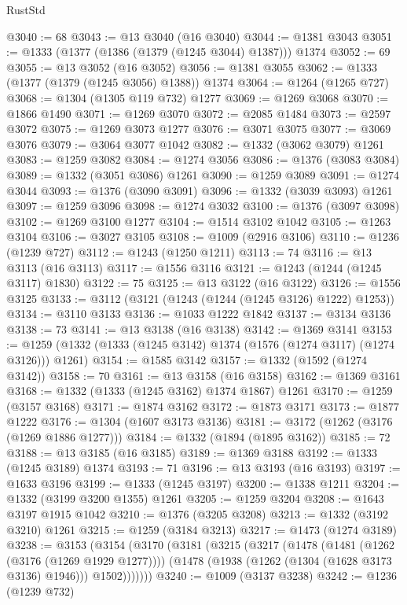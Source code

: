 \begin{lexlean}{RustStd}
\begin{coremodule}
@3040 := 68
@3043 := @13 @3040 (@16 @3040)
@3044 := @1381 @3043
@3051 := @1333 (@1377 (@1386 (@1379 (@1245 @3044) @1387))) @1374
@3052 := 69
@3055 := @13 @3052 (@16 @3052)
@3056 := @1381 @3055
@3062 := @1333 (@1377 (@1379 (@1245 @3056) @1388)) @1374
@3064 := @1264 (@1265 @727)
@3068 := @1304 (@1305 @119 @732) @1277
@3069 := @1269 @3068
@3070 := @1866 @1490
@3071 := @1269 @3070
@3072 := @2085 @1484
@3073 := @2597 @3072
@3075 := @1269 @3073 @1277
@3076 := @3071 @3075
@3077 := @3069 @3076
@3079 := @3064 @3077 @1042
@3082 := @1332 (@3062 @3079) @1261
@3083 := @1259 @3082
@3084 := @1274 @3056
@3086 := @1376 (@3083 @3084)
@3089 := @1332 (@3051 @3086) @1261
@3090 := @1259 @3089
@3091 := @1274 @3044
@3093 := @1376 (@3090 @3091)
@3096 := @1332 (@3039 @3093) @1261
@3097 := @1259 @3096
@3098 := @1274 @3032
@3100 := @1376 (@3097 @3098)
@3102 := @1269 @3100 @1277
@3104 := @1514 @3102 @1042
@3105 := @1263 @3104
@3106 := @3027 @3105
@3108 := @1009 (@2916 @3106)
@3110 := @1236 (@1239 @727)
@3112 := @1243 (@1250 @1211)
@3113 := 74
@3116 := @13 @3113 (@16 @3113)
@3117 := @1556 @3116
@3121 := @1243 (@1244 (@1245 @3117) @1830)
@3122 := 75
@3125 := @13 @3122 (@16 @3122)
@3126 := @1556 @3125
@3133 := @3112 (@3121 (@1243 (@1244 (@1245 @3126) @1222) @1253))
@3134 := @3110 @3133
@3136 := @1033 @1222 @1842
@3137 := @3134 @3136
@3138 := 73
@3141 := @13 @3138 (@16 @3138)
@3142 := @1369 @3141
@3153 := @1259 (@1332 (@1333 (@1245 @3142) @1374 (@1576 (@1274 @3117) (@1274 @3126))) @1261)
@3154 := @1585 @3142
@3157 := @1332 (@1592 (@1274 @3142))
@3158 := 70
@3161 := @13 @3158 (@16 @3158)
@3162 := @1369 @3161
@3168 := @1332 (@1333 (@1245 @3162) @1374 @1867) @1261
@3170 := @1259 (@3157 @3168)
@3171 := @1874 @3162
@3172 := @1873 @3171
@3173 := @1877 @1222
@3176 := @1304 (@1607 @3173 @3136)
@3181 := @3172 (@1262 (@3176 (@1269 @1886 @1277)))
@3184 := @1332 (@1894 (@1895 @3162))
@3185 := 72
@3188 := @13 @3185 (@16 @3185)
@3189 := @1369 @3188
@3192 := @1333 (@1245 @3189) @1374
@3193 := 71
@3196 := @13 @3193 (@16 @3193)
@3197 := @1633 @3196
@3199 := @1333 (@1245 @3197)
@3200 := @1338 @1211
@3204 := @1332 (@3199 @3200 @1355) @1261
@3205 := @1259 @3204
@3208 := @1643 @3197 @1915 @1042
@3210 := @1376 (@3205 @3208)
@3213 := @1332 (@3192 @3210) @1261
@3215 := @1259 (@3184 @3213)
@3217 := @1473 (@1274 @3189)
@3238 := @3153
    (@3154
      (@3170
        (@3181
          (@3215
            (@3217
              (@1478
                (@1481 (@1262 (@3176 (@1269 @1929 @1277))))
                (@1478 (@1938 (@1262 (@1304 (@1628 @3173 @3136) @1946))) @1502)))))))
@3240 := @1009 (@3137 @3238)
@3242 := @1236 (@1239 @732)

\end{coremodule}
\end{lexlean}
